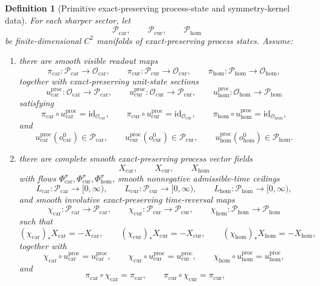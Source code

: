 \documentclass[11pt]{article}
\newcommand{\TensorObjClass}{\mathcal O_{\mathrm{car}}}
\newcommand{\CurObjClass}{\mathcal O_{\mathrm{cur}}}
\newcommand{\HomObjClass}{\mathcal O_{\mathrm{hom}}}
\newcommand{\TensorObjBase}{o_{\mathrm{car}}^0}
\newcommand{\CurObjBase}{o_{\mathrm{cur}}^0}
\newcommand{\HomObjBase}{o_{\mathrm{hom}}^0}
\newcommand{\TensorProcSpace}{\mathcal P_{\mathrm{car}}}
\newcommand{\CurProcSpace}{\mathcal P_{\mathrm{cur}}}
\newcommand{\HomProcSpace}{\mathcal P_{\mathrm{hom}}}
\newcommand{\TensorProcRead}{\pi_{\mathrm{car}}}
\newcommand{\CurProcRead}{\pi_{\mathrm{cur}}}
\newcommand{\HomProcRead}{\pi_{\mathrm{hom}}}
\newcommand{\TensorProcUnit}{u_{\mathrm{car}}^{\mathrm{proc}}}
\newcommand{\CurProcUnit}{u_{\mathrm{cur}}^{\mathrm{proc}}}
\newcommand{\HomProcUnit}{u_{\mathrm{hom}}^{\mathrm{proc}}}
\newcommand{\TensorFlowField}{X_{\mathrm{car}}}
\newcommand{\CurFlowField}{X_{\mathrm{cur}}}
\newcommand{\HomFlowField}{X_{\mathrm{hom}}}
\newcommand{\TensorOrbitFlow}{\Phi_{\mathrm{car}}}
\newcommand{\CurOrbitFlow}{\Phi_{\mathrm{cur}}}
\newcommand{\HomOrbitFlow}{\Phi_{\mathrm{hom}}}
\newcommand{\TensorProcLength}{L_{\mathrm{car}}}
\newcommand{\CurProcLength}{L_{\mathrm{cur}}}
\newcommand{\HomProcLength}{L_{\mathrm{hom}}}
\newcommand{\TensorProcTimeRev}{\chi_{\mathrm{car}}}
\newcommand{\CurProcTimeRev}{\chi_{\mathrm{cur}}}
\newcommand{\HomProcTimeRev}{\chi_{\mathrm{hom}}}
\newtheorem{definition}{Definition}
\begin{document}
\begin{definition}[Primitive exact-preserving process-state and symmetry-kernel data]
\label{def:process_state}
For each sharper sector, let
\[
\TensorProcSpace,\qquad
\CurProcSpace,\qquad
\HomProcSpace
\]
be finite-dimensional \(C^2\) manifolds of exact-preserving process states. Assume:
\begin{enumerate}
    \item there are smooth visible readout maps
    \[
    \TensorProcRead:\TensorProcSpace\to\TensorObjClass,\qquad
    \CurProcRead:\CurProcSpace\to\CurObjClass,\qquad
    \HomProcRead:\HomProcSpace\to\HomObjClass,
    \]
    together with exact-preserving unit-state sections
    \[
    \TensorProcUnit:\TensorObjClass\to\TensorProcSpace,\qquad
    \CurProcUnit:\CurObjClass\to\CurProcSpace,\qquad
    \HomProcUnit:\HomObjClass\to\HomProcSpace
    \]
    satisfying
    \[
    \TensorProcRead\circ\TensorProcUnit=\mathrm{id}_{\TensorObjClass},\qquad
    \CurProcRead\circ\CurProcUnit=\mathrm{id}_{\CurObjClass},\qquad
    \HomProcRead\circ\HomProcUnit=\mathrm{id}_{\HomObjClass},
    \]
    and
    \[
    \TensorProcUnit(\TensorObjBase)\in\TensorProcSpace,\qquad
    \CurProcUnit(\CurObjBase)\in\CurProcSpace,\qquad
    \HomProcUnit(\HomObjBase)\in\HomProcSpace.
    \]
    \item there are complete smooth exact-preserving process vector fields
    \[
    \TensorFlowField,\qquad
    \CurFlowField,\qquad
    \HomFlowField
    \]
    with flows \(\TensorOrbitFlow^\sigma,\CurOrbitFlow^\sigma,\HomOrbitFlow^\sigma\), smooth nonnegative admissible-time ceilings
    \[
    \TensorProcLength:\TensorProcSpace\to[0,\infty),\qquad
    \CurProcLength:\CurProcSpace\to[0,\infty),\qquad
    \HomProcLength:\HomProcSpace\to[0,\infty),
    \]
    and smooth involutive exact-preserving time-reversal maps
    \[
    \TensorProcTimeRev:\TensorProcSpace\to\TensorProcSpace,\qquad
    \CurProcTimeRev:\CurProcSpace\to\CurProcSpace,\qquad
    \HomProcTimeRev:\HomProcSpace\to\HomProcSpace
    \]
    such that
    \[
    (\TensorProcTimeRev)_*\TensorFlowField=-\TensorFlowField,\qquad
    (\CurProcTimeRev)_*\CurFlowField=-\CurFlowField,\qquad
    (\HomProcTimeRev)_*\HomFlowField=-\HomFlowField,
    \]
    together with
    \[
    \TensorProcTimeRev\circ\TensorProcUnit=\TensorProcUnit,\qquad
    \CurProcTimeRev\circ\CurProcUnit=\CurProcUnit,\qquad
    \HomProcTimeRev\circ\HomProcUnit=\HomProcUnit,
    \]
    and
    \[
    \TensorProcRead\circ\TensorProcTimeRev=\TensorProcRead,\qquad
    \CurProcRead\circ\CurProcTimeRev=\CurProcRead,\qquad
\]
\end{enumerate}
\end{definition}
\end{document}

